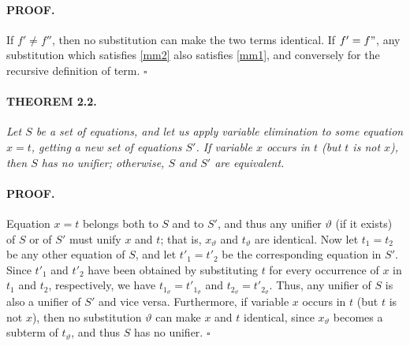 \paragraph{PROOF.} If $f' \neq f''$, then no substitution can make the
two terms identical.
If $f' = f"$, any substitution which satisfies \ref{mm2} also satisfies
\ref{mm1}, and conversely for the recursive definition of term. $\square$

\paragraph{THEOREM 2.2.} \textit{Let $S$ be a set of equations, and let us apply
variable elimination to some equation $x = t$, getting a new set of equations
$S'$. If variable $x$ occurs in $t$ (but $t$ is not $x$), then $S$ has no
unifier; otherwise, $S$ and $S'$ are equivalent.}

\paragraph{PROOF.} Equation $x = t$ belongs both to $S$ and to $S'$, and thus
any unifier $\vartheta$ (if it exists) of $S$ or of $S'$ must unify $x$ and $t$;
that is, $x_\vartheta$ and $t_\vartheta$ are identical. Now let $t_1 = t_2$ be
any other equation of $S$, and let $t'_1 = t'_2$ be the corresponding equation
in $S'$. Since $t'_1$ and $t'_2$ have been obtained by substituting $t$ for
every occurrence of $x$ in $t_1$ and $t_2$, respectively, we have
$t_{1_\vartheta}=t'_{1_\vartheta}$ and $t_{2_\vartheta}=t'_{2_\vartheta}$. Thus,
any unifier of $S$ is also a unifier of $S'$ and vice versa. Furthermore, if
variable $x$ occurs in $t$ (but $t$ is not $x$), then no substitution
$\vartheta$ can make $x$ and $t$ identical, since $x_\vartheta$ becomes a
subterm of $t_\vartheta$, and thus $S$ has no unifier. $\square$
  
\secup
